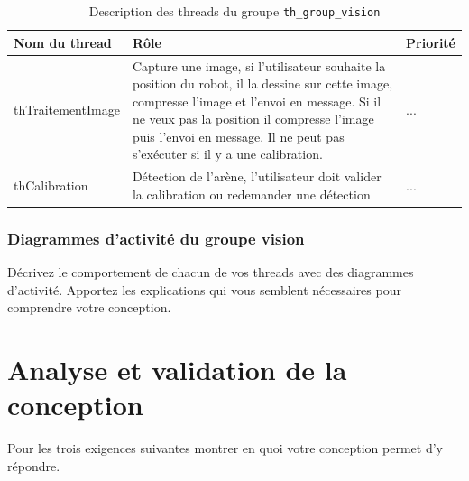 \documentclass[11pt, a4paper]{paper}
\begin{document}
\begin{table}[htp]
\caption{Description des threads du groupe {\tt th\_group\_vision}}
\begin{center}
\begin{tabular}{|p{3cm}|p{8.5cm}|p{2cm}|}
\hline
\bf Nom du thread &	\bf Rôle &	\bf Priorité \\
\hline
\hline
\color{black}thTraitementImage &	\color{black}Capture une image, si l'utilisateur souhaite la position du robot, il la dessine sur cette image, compresse l'image et l'envoi en message. Si il ne veux pas la position il compresse l'image puis l'envoi en message. Il ne peut pas s'exécuter si il y a une calibration. &	\color{blue}...\\
\hline
\color{black}thCalibration &	\color{black}Détection de l'arène, l'utilisateur doit valider la calibration ou redemander une détection &	\color{blue}...\\
\hline
\end{tabular}
\end{center}
\label{tab:gt_moniteur}
\end{table}%
\FloatBarrier

\subsubsection{Diagrammes d'activité du groupe vision}
{\color{blue}Décrivez le comportement de chacun de vos threads avec des diagrammes d'activité. Apportez les explications qui vous semblent nécessaires pour comprendre votre conception.}




\section{Analyse et validation de la conception}

{\color{red}
Pour les trois exigences suivantes montrer en quoi votre conception permet d’y répondre. }
\end{document}
